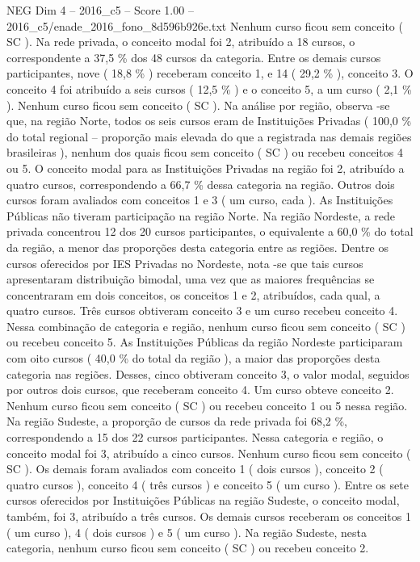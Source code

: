 \begin{textsample}{NEG Dim 4 – 2016\_c5 – Score 1.00 – 2016\_c5/enade\_2016\_fono\_8d596b926e.txt}
Nenhum curso ficou sem conceito ( SC ).
Na rede privada, o conceito modal foi 2, atribuído a 18 cursos, o correspondente a 37,5 \% dos 48 cursos da categoria.
Entre os demais cursos participantes, nove ( 18,8 \% ) receberam conceito 1, e 14 ( 29,2 \% ), conceito 3.
O conceito 4 foi atribuído a seis cursos ( 12,5 \% ) e o conceito 5, a um curso ( 2,1 \% ).
Nenhum curso ficou sem conceito ( SC ).
Na análise por região, observa -se que, na região Norte, todos os seis cursos eram de Instituições Privadas ( 100,0 \% do total regional – proporção mais elevada do que a registrada nas demais regiões brasileiras ), nenhum dos quais ficou sem conceito ( SC ) ou recebeu conceitos 4 ou 5.
O conceito modal para as Instituições Privadas na região foi 2, atribuído a quatro cursos, correspondendo a 66,7 \% dessa categoria na região.
Outros dois cursos foram avaliados com conceitos 1 e 3 ( um curso, cada ).
As Instituições Públicas não tiveram participação na região Norte.
Na região Nordeste, a rede privada concentrou 12 dos 20 cursos participantes, o equivalente a 60,0 \% do total da região, a menor das proporções desta categoria entre as regiões.
Dentre os cursos oferecidos por IES Privadas no Nordeste, nota -se que tais cursos apresentaram distribuição bimodal, uma vez que as maiores frequências se concentraram em dois conceitos, os conceitos 1 e 2, atribuídos, cada qual, a quatro cursos.
Três cursos obtiveram conceito 3 e um curso recebeu conceito 4.
Nessa combinação de categoria e região, nenhum curso ficou sem conceito ( SC ) ou recebeu conceito 5.
As Instituições Públicas da região Nordeste participaram com oito cursos ( 40,0 \% do total da região ), a maior das proporções desta categoria nas regiões.
Desses, cinco obtiveram conceito 3, o valor modal, seguidos por outros dois cursos, que receberam conceito 4.
Um curso obteve conceito 2.
Nenhum curso ficou sem conceito ( SC ) ou recebeu conceito 1 ou 5 nessa região.
Na região Sudeste, a proporção de cursos da rede privada foi 68,2 \%, correspondendo a 15 dos 22 cursos participantes.
Nessa categoria e região, o conceito modal foi 3, atribuído a cinco cursos.
Nenhum curso ficou sem conceito ( SC ).
Os demais foram avaliados com conceito 1 ( dois cursos ), conceito 2 ( quatro cursos ), conceito 4 ( três cursos ) e conceito 5 ( um curso ).
Entre os sete cursos oferecidos por Instituições Públicas na região Sudeste, o conceito modal, também, foi 3, atribuído a três cursos.
Os demais cursos receberam os conceitos 1 ( um curso ), 4 ( dois cursos ) e 5 ( um curso ).
Na região Sudeste, nesta categoria, nenhum curso ficou sem conceito ( SC ) ou recebeu conceito 2.

\end{textsample}
